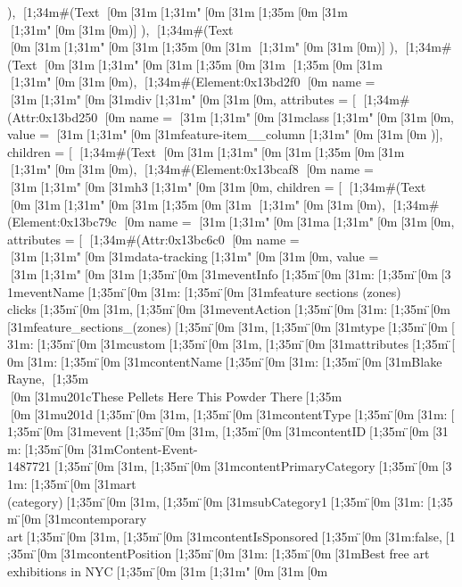 {{{{{{                      }),
                    [1;34m#(Text [0m[31m[1;31m"[0m[31m[1;35m\n[0m[31m                                [1;31m"[0m[31m[0m)]
                  }),
                [1;34m#(Text [0m[31m[1;31m"[0m[31m[1;35m\n[0m[31m            [1;31m"[0m[31m[0m)]
              }),
            [1;34m#(Text [0m[31m[1;31m"[0m[31m[1;35m\n[0m[31m        [1;35m\n[0m[31m        [1;31m"[0m[31m[0m),
            [1;34m#(Element:0x13bd2f0 {[0m
              name = [31m[1;31m"[0m[31mdiv[1;31m"[0m[31m[0m,
              attributes = [ [1;34m#(Attr:0x13bd250 {[0m name = [31m[1;31m"[0m[31mclass[1;31m"[0m[31m[0m, value = [31m[1;31m"[0m[31mfeature-item__column[1;31m"[0m[31m[0m })],
              children = [
                [1;34m#(Text [0m[31m[1;31m"[0m[31m[1;35m\n[0m[31m                                            [1;31m"[0m[31m[0m),
                [1;34m#(Element:0x13bcaf8 {[0m
                  name = [31m[1;31m"[0m[31mh3[1;31m"[0m[31m[0m,
                  children = [
                    [1;34m#(Text [0m[31m[1;31m"[0m[31m[1;35m\n[0m[31m                                            [1;31m"[0m[31m[0m),
                    [1;34m#(Element:0x13bc79c {[0m
                      name = [31m[1;31m"[0m[31ma[1;31m"[0m[31m[0m,
                      attributes = [
                        [1;34m#(Attr:0x13bc6c0 {[0m
                          name = [31m[1;31m"[0m[31mdata-tracking[1;31m"[0m[31m[0m,
                          value = [31m[1;31m"[0m[31m{[1;35m\"[0m[31meventInfo[1;35m\"[0m[31m:{[1;35m\"[0m[31meventName[1;35m\"[0m[31m:[1;35m\"[0m[31mfeature sections (zones) clicks[1;35m\"[0m[31m,[1;35m\"[0m[31meventAction[1;35m\"[0m[31m:[1;35m\"[0m[31mfeature_sections_(zones)[1;35m\"[0m[31m,[1;35m\"[0m[31mtype[1;35m\"[0m[31m:[1;35m\"[0m[31mcustom[1;35m\"[0m[31m},[1;35m\"[0m[31mattributes[1;35m\"[0m[31m:{[1;35m\"[0m[31mcontentName[1;35m\"[0m[31m:[1;35m\"[0m[31mBlake Rayne, [1;35m\\[0m[31mu201cThese Pellets Here This Powder There[1;35m\\[0m[31mu201d[1;35m\"[0m[31m,[1;35m\"[0m[31mcontentType[1;35m\"[0m[31m:[1;35m\"[0m[31mevent[1;35m\"[0m[31m,[1;35m\"[0m[31mcontentID[1;35m\"[0m[31m:[1;35m\"[0m[31mContent-Event-1487721[1;35m\"[0m[31m,[1;35m\"[0m[31mcontentPrimaryCategory[1;35m\"[0m[31m:[1;35m\"[0m[31mart (category)[1;35m\"[0m[31m,[1;35m\"[0m[31msubCategory1[1;35m\"[0m[31m:[1;35m\"[0m[31mcontemporary art[1;35m\"[0m[31m,[1;35m\"[0m[31mcontentIsSponsored[1;35m\"[0m[31m:false,[1;35m\"[0m[31mcontentPosition[1;35m\"[0m[31m:[1;35m\"[0m[31mBest free art exhibitions in NYC[1;35m\"[0m[31m}}[1;31m"[0m[31m[0m
}}}}}}}
